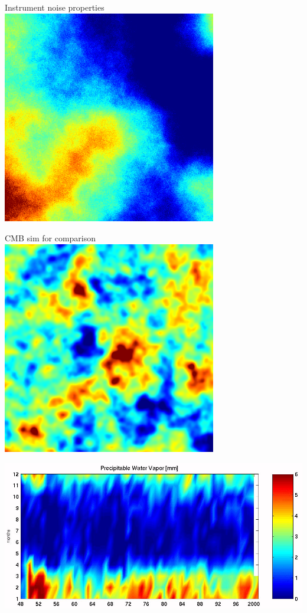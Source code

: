 \documentclass[table]{beamer}
\begin{document}
\begin{frame}{Instrument noise properties}
	\centering
	\includegraphics[width=0.7\textwidth]{maps/noise_sim.png}
\end{frame}
\begin{frame}{CMB sim for comparison}
	\centering
	\includegraphics[width=0.7\textwidth]{maps/cmb_sim.png}
\end{frame}

\begin{frame}
	\centering
	\includegraphics[width=\textwidth]{pwv_chajnantor_eso.jpeg}
\end{frame}
\end{document}

